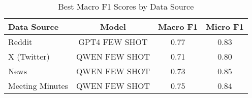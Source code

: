 \begin{table}[htbp]
\centering
\caption{Best Macro F1 Scores by Data Source}
\label{tab:best_macro_f1_scores}
\begin{tabular}{lccc}
\toprule
Data Source & Model & Macro F1 & Micro F1 \\
\midrule
Reddit & GPT4 FEW SHOT & 0.77 & 0.83 \\
X (Twitter) & QWEN FEW SHOT & 0.71 & 0.80 \\
News & QWEN FEW SHOT & 0.73 & 0.85 \\
Meeting Minutes & QWEN FEW SHOT & 0.75 & 0.84 \\
\bottomrule
\end{tabular}
\end{table}